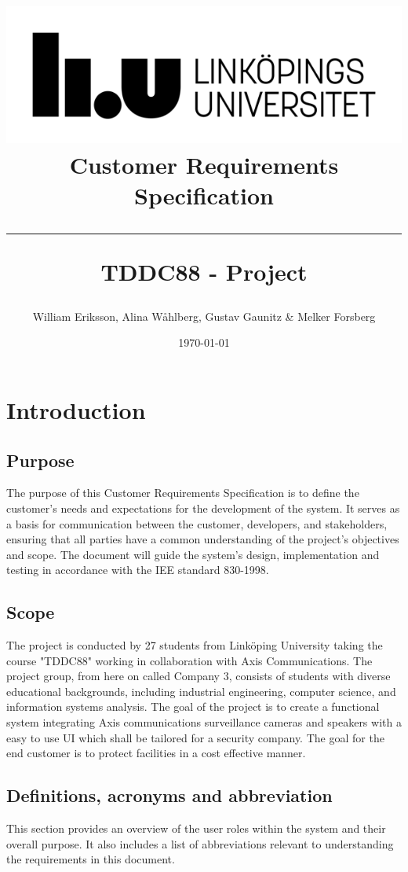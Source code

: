 \documentclass{article}
\title{
\includegraphics[scale=1.5]{liu_logga.png} \\
\vspace{2.0cm} \textbf{Customer Requirements Specification} \\
 \endgraf\rule{\textwidth}{.4pt}
  \large \textbf{TDDC88 - Project}\\
 
   }
\author{William Eriksson, Alina Wåhlberg, Gustav Gaunitz \& Melker Forsberg}
\date{\today}
\begin{document}
\maketitle


\newpage
\tableofcontents
\newpage

\section{Introduction}


\subsection{Purpose}
The purpose of this Customer Requirements Specification is to define the customer’s needs and expectations for the development of the system. It serves as a basis for communication between the customer, developers, and stakeholders, ensuring that all parties have a common understanding of the project’s objectives and scope. The document will guide the system's design, implementation and testing in accordance with the IEE standard 830-1998.


\subsection{Scope}

The project is conducted by 27 students from Linköping University taking the course "TDDC88" working in collaboration with Axis Communications. The project group, from here on called Company 3, consists of students with diverse educational backgrounds, including industrial engineering, computer science, and information systems analysis. The goal of the project is to create a functional system integrating Axis communications surveillance cameras and speakers with a easy to use UI which shall be tailored for a security company. The goal for the end customer is to protect facilities in a cost effective manner. 



\subsection{Definitions, acronyms and abbreviation}

This section provides an overview of the user roles within the system and their overall purpose. It also includes a list of abbreviations relevant to understanding the requirements in this document.
\end{document}
